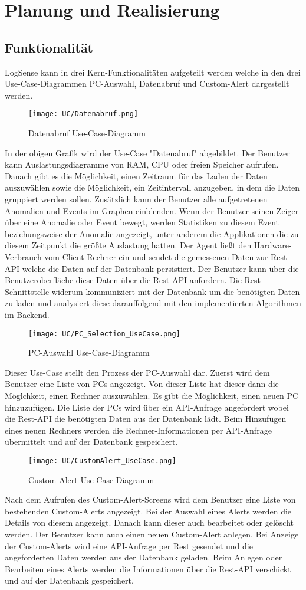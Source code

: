 \documentclass{report}
\begin{document}
\chapter{Planung und Realisierung}
\section{Funktionalität}
LogSense kann in drei Kern-Funktionalitäten aufgeteilt werden welche in den drei Use-Case-Diagrammen PC-Auswahl, Datenabruf und Custom-Alert dargestellt werden.
\begin{figure}[H]
    \centering
    \texttt{[image: UC/Datenabruf.png]}
    \caption{Datenabruf Use-Case-Diagramm}
\end{figure}
In der obigen Grafik wird der Use-Case "Datenabruf" abgebildet. Der Benutzer kann Auslastungsdiagramme von RAM, CPU oder freien Speicher aufrufen. Danach gibt es die Möglichkeit, einen Zeitraum für das Laden der Daten auszuwählen sowie die Möglichkeit, ein Zeitintervall anzugeben, in dem die Daten gruppiert werden sollen. Zusätzlich kann der Benutzer alle aufgetretenen Anomalien und Events im Graphen einblenden. Wenn der Benutzer seinen Zeiger über eine Anomalie oder Event bewegt, werden Statistiken zu diesem Event beziehungsweise der Anomalie angezeigt, unter anderem die Applikationen die zu diesem Zeitpunkt die größte Auslastung hatten. Der Agent ließt den Hardware-Verbrauch vom Client-Rechner ein und sendet die gemessenen Daten zur Rest-API welche die Daten auf der Datenbank persistiert. Der Benutzer kann über die Benutzeroberfläche diese Daten über die Rest-API anfordern. Die Rest-Schnittstelle widerum kommuniziert mit der Datenbank um die benötigten Daten zu laden und analysiert diese darauffolgend mit den implementierten Algorithmen im Backend. 
\begin{figure}[H]
    \centering
    \texttt{[image: UC/PC\_Selection\_UseCase.png]}
    \caption{PC-Auswahl Use-Case-Diagramm}
\end{figure}
Dieser Use-Case stellt den Prozess der PC-Auswahl dar. Zuerst wird dem Benutzer eine Liste von PCs angezeigt. Von dieser Liste hat dieser dann die Möglchkeit, einen Rechner auszuwählen. Es gibt die Möglichkeit, einen neuen PC hinzuzufügen. Die Liste der PCs wird über ein API-Anfrage angefordert wobei die Rest-API die benötigten Daten aus der Datenbank lädt. Beim Hinzufügen eines neuen Rechners werden die Rechner-Informationen per API-Anfrage übermittelt und auf der Datenbank gespeichert.
\begin{figure}[H]
    \centering
    \texttt{[image: UC/CustomAlert\_UseCase.png]}
    \caption{Custom Alert Use-Case-Diagramm}
\end{figure}
Nach dem Aufrufen des Custom-Alert-Screens wird dem Benutzer eine Liste von bestehenden Custom-Alerts angezeigt. Bei der Auswahl eines Alerts werden die Details von diesem angezeigt. Danach kann dieser auch bearbeitet oder gelöscht werden. Der Benutzer kann auch einen neuen Custom-Alert anlegen. Bei Anzeige der Custom-Alerts wird eine API-Anfrage per Rest gesendet und die angeforderten Daten werden aus der Datenbank geladen. Beim Anlegen oder Bearbeiten eines Alerts werden die Informationen über die Rest-API verschickt und auf der Datenbank gespeichert. 
\end{document}
